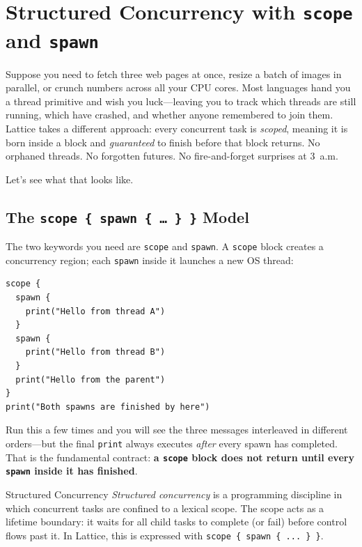 \chapter{Structured Concurrency with \texttt{scope} and \texttt{spawn}}\label{ch:structured-concurrency}


Suppose you need to fetch three web pages at once, resize a batch of images in parallel, or crunch numbers across all your CPU cores.
Most languages hand you a thread primitive and wish you luck---leaving you to track which threads are still running, which have crashed, and whether anyone remembered to join them.
Lattice takes a different approach: every concurrent task is \emph{scoped}, meaning it is born inside a block and \emph{guaranteed} to finish before that block returns.
No orphaned threads. No forgotten futures. No fire-and-forget surprises at 3~a.m.

Let's see what that looks like.

\section{The \texttt{scope \{ spawn \{ \ldots\ \} \}} Model}\label{sec:scope-spawn-model}


The two keywords you need are \lstinline|scope| and \lstinline|spawn|.
A \lstinline|scope| block creates a concurrency region; each \lstinline|spawn| inside it launches a new OS thread:

\begin{lstlisting}[language=Lattice, caption={Your first scope/spawn}]
scope {
  spawn {
    print("Hello from thread A")
  }
  spawn {
    print("Hello from thread B")
  }
  print("Hello from the parent")
}
print("Both spawns are finished by here")
\end{lstlisting}

Run this a few times and you will see the three messages interleaved in different orders---but the final \lstinline|print| always executes \emph{after} every spawn has completed.
That is the fundamental contract: \textbf{a \lstinline|scope| block does not return until every \lstinline|spawn| inside it has finished}.

\begin{defnbox}{Structured Concurrency}
\emph{Structured concurrency} is a programming discipline in which concurrent tasks are confined to a lexical scope.
The scope acts as a lifetime boundary: it waits for all child tasks to complete (or fail) before control flows past it.
In Lattice, this is expressed with \lstinline|scope { spawn { ... } }|.
\end{defnbox}

